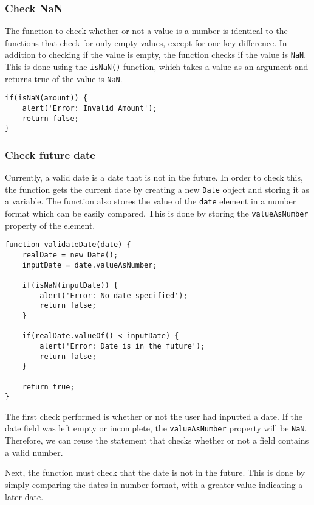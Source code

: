 \documentclass[letterpaper]{article}
\begin{document}
\subsubsection{Check NaN}

The function to check whether or not a value is a number is identical to the functions that check for only empty values, except for one key difference.
In addition to checking if the value is empty, the function checks if the value is \lstinline{NaN}.
This is done using the \lstinline{isNaN()} function, which takes a value as an argument and returns true of the value is \lstinline{NaN}.

\begin{lstlisting}[firstnumber=87]
if(isNaN(amount)) {
    alert('Error: Invalid Amount');
    return false;
}
\end{lstlisting}

\subsubsection{Check future date}

Currently, a valid date is a date that is not in the future.
In order to check this, the function gets the current date by creating a new \lstinline{Date} object and storing it as a variable.
The function also stores the value of the \lstinline{date} element in a number format which can be easily compared.
This is done by storing the \lstinline{valueAsNumber} property of the element.

\begin{lstlisting}[firstnumber=37]
function validateDate(date) {
    realDate = new Date();
    inputDate = date.valueAsNumber;

    if(isNaN(inputDate)) {
        alert('Error: No date specified');
        return false;
    }

    if(realDate.valueOf() < inputDate) {
        alert('Error: Date is in the future');
        return false;
    }

    return true;
}
\end{lstlisting}

The first check performed is whether or not the user had inputted a date.
If the date field was left empty or incomplete, the \lstinline{valueAsNumber} property will be \lstinline{NaN}.
Therefore, we can reuse the statement that checks whether or not a field contains a valid number.

Next, the function must check that the date is not in the future.
This is done by simply comparing the dates in number format, with a greater value indicating a later date.
\end{document}
